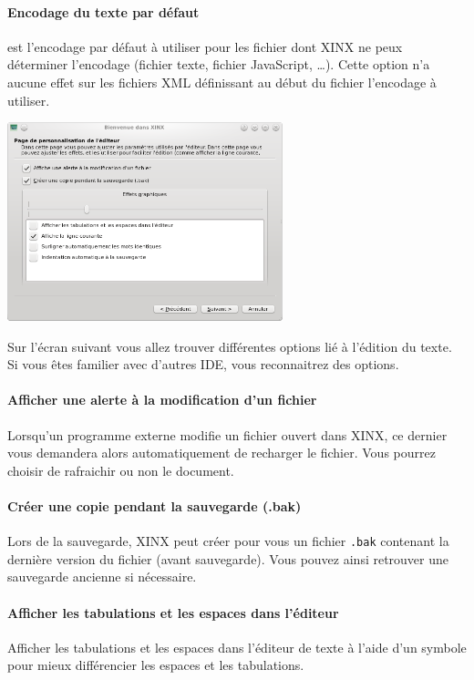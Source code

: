 \documentclass[a4paper,10pt,twoside]{book}
\begin{document}
\paragraph{Encodage du texte par défaut} est l'encodage par défaut à utiliser pour les fichier dont XINX ne peux déterminer l'encodage (fichier texte, fichier JavaScript, \dots). Cette option n'a aucune effet sur les fichiers XML définissant au début du fichier l'encodage à utiliser.

\begin{center}
 \includegraphics[width=0.60\textwidth]{./firstinstall3.png}
\end{center}

Sur l'écran suivant vous allez trouver différentes options lié à l'édition du texte. Si vous êtes familier avec d'autres IDE, vous reconnaitrez des options. 

\paragraph{Afficher une alerte à la modification d'un fichier} Lorsqu'un programme externe modifie un fichier ouvert dans XINX, ce dernier vous demandera alors automatiquement de recharger le fichier. Vous pourrez choisir de rafraichir ou non le document.

\paragraph{Créer une copie pendant la sauvegarde (.bak)} Lors de la sauvegarde, XINX peut créer pour vous un fichier \verb+.bak+ contenant la dernière version du fichier (avant sauvegarde). Vous pouvez ainsi retrouver une sauvegarde ancienne si nécessaire.

\paragraph{Afficher les tabulations et les espaces dans l'éditeur} Afficher les tabulations et les espaces dans l'éditeur de texte à l'aide d'un symbole pour mieux différencier les espaces et les tabulations.
\end{document}
